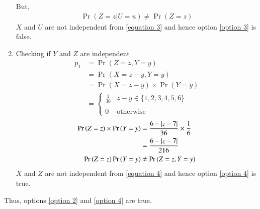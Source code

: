 \documentclass[journal,12pt,twocolumn]{IEEEtran}
\begin{document}
\begin{enumerate}
But,
\begin{align}
    \Pr{(Z=z| U=u)} \neq \Pr{(Z=z)} \label{equation 3}
\end{align}
$X$ and $U$ are not independent from \eqref{equation 3} and hence option \eqref{option 3} is false.
\item Checking if $Y$ and $Z$ are independent
\begin{align}
    p_1 &= \Pr{(Z=z, Y=y)}
    \\ &= \Pr{(X=z-y, Y=y)}
    \\ &= \Pr{(X=z-y)} \times \Pr{(Y=y)}
    \\ &= \begin{cases}
        \frac{1}{36} & z-y \in \{1, 2, 3, 4, 5, 6\}\\ ~\\[-1em]
        0 & \text{otherwise}
    \end{cases}
\end{align}
\begin{align}
    \Pr{(Z=z)}\times \Pr{(Y=y)} &= \frac{6 - \vert z-7\vert}{36} \times \frac{1}{6}
    \\&= \frac{6 - \vert z-7\vert}{216}
    \\\Pr{(Z=z)}\Pr{(Y=y)} &\neq \Pr{(Z=z, Y=y)}  \label{equation 4}
\end{align}
$X$ and $Z$ are not independent from \eqref{equation 4} and hence option \eqref{option 4} is true.
\end{enumerate}
Thus, options \eqref{option 2} and \eqref{option 4} are true.
\end{document}
